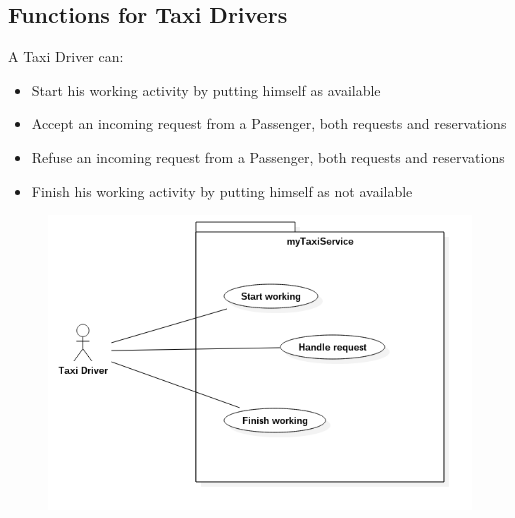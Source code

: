 \subsection{Functions for Taxi Drivers}
A Taxi Driver can:
\begin{itemize}
\item Start his working activity by putting himself as available
\item Accept an incoming request from a Passenger, both requests and reservations
\item Refuse an incoming request from a Passenger, both requests and reservations
\item Finish his working activity by putting himself as not available
\end{itemize}
\begin{figure}[H]
\centering
\includegraphics[scale=0.5]{Images/uc_highLevel_taxiDriver}
\end{figure}